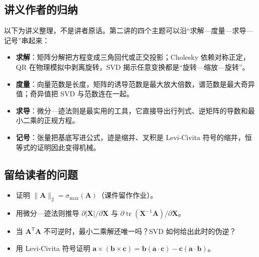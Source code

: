 \documentclass[a4paper]{article}
\begin{document}
\subsection{讲义作者的归纳}

以下为讲义整理，不是讲者原话。第二讲的四个主题可以沿“求解—度量—求导—记号”串起来：
\begin{itemize}
\item \textbf{求解}：矩阵分解把方程变成三角回代或正交投影；Cholesky 依赖对称正定，QR 在物理模拟中剥离旋转，SVD 揭示任意变换都是“旋转—缩放—旋转”。
\item \textbf{度量}：向量范数是长度，矩阵的诱导范数是最大放大倍数，谱范数是最大奇异值；奇异值把 SVD 与范数连在一起。
\item \textbf{求导}：微分—迹法则是最实用的工具，它直接导出行列式、逆矩阵的导数和最小二乘的正规方程。
\item \textbf{记号}：张量把基底写进公式，迹是缩并、叉积是 Levi-Civita 符号的缩并，恒等式的证明因此变得机械。
\end{itemize}

\subsection{留给读者的问题}

\begin{itemize}
\item 证明 $\|\boldsymbol A\|_2=\sigma_{\max}(\boldsymbol A)$（课件留作作业）。
\item 用微分—迹法则推导 $\partial|\boldsymbol X|/\partial\boldsymbol X$ 与 $\partial\operatorname{tr}(\boldsymbol X^{-1}\boldsymbol A)/\partial\boldsymbol X$。
\item 当 $\boldsymbol A^{\mathsf T}\boldsymbol A$ 不可逆时，最小二乘解还唯一吗？SVD 如何给出此时的伪逆？
\item 用 Levi-Civita 符号证明 $\boldsymbol a\times(\boldsymbol b\times\boldsymbol c)=\boldsymbol b(\boldsymbol a\cdot\boldsymbol c)-\boldsymbol c(\boldsymbol a\cdot\boldsymbol b)$。
\end{itemize}
\end{document}

